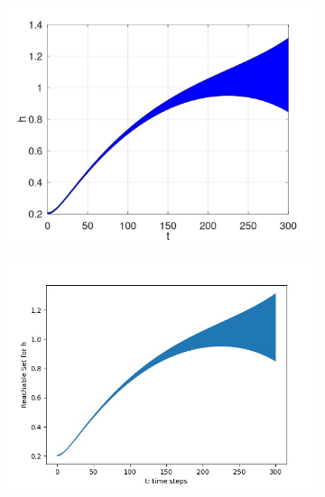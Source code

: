 \documentclass[EPiC]{easychair}
\begin{document}
\begin{figure}[h]
    \begin{subfigure}{0.45\textwidth}
    \centering
    \includegraphics[width=\textwidth]{SapoFigures/Quad/SapoQuad_H.jpg}
    \end{subfigure}
    \begin{subfigure}{0.47\textwidth}
    \centering
    \includegraphics[width=1.1\textwidth,height=0.8\textwidth]{SapoFigures/Quad/KaaQuad_H.jpg}
    \end{subfigure}
    

\end{figure}
\end{document}
